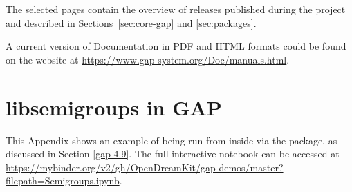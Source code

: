 \documentclass{deliverablereport}
\begin{document}
The selected pages contain the overview of \GAP releases published
during the project and described in Sections~\ref{sec:core-gap} and \ref{sec:packages}.

A current version of \GAP Documentation in PDF and HTML formats
could be found on the \GAP website at \url{https://www.gap-system.org/Doc/manuals.html}.

%



\section{libsemigroups in GAP}
\label{sec:libsemigroups-notebook}

This Appendix shows an example of  being run from inside
\GAP via the  package, as discussed in Section \ref{gap-4.9}.
The full interactive notebook can be accessed at
\url{https://mybinder.org/v2/gh/OpenDreamKit/gap-demos/master?filepath=Semigroups.ipynb}.

\vspace{1.0em}
\end{document}

